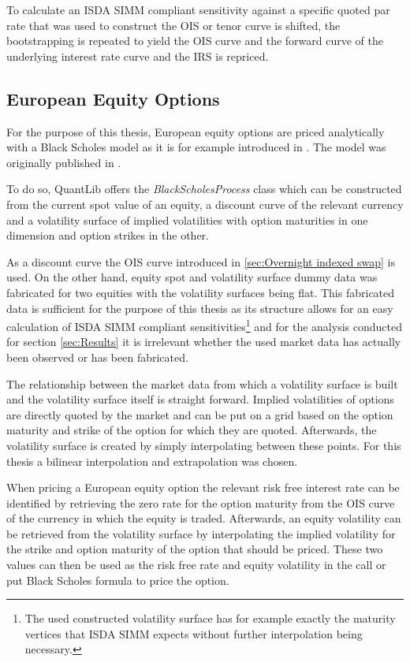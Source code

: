 \documentclass[../Thesis_AHoecherl.tex]{subfiles}
\begin{document}
    To calculate an ISDA SIMM compliant sensitivity against a specific quoted par rate that was used to construct the OIS or tenor curve is shifted, the bootstrapping is repeated to yield the OIS curve and the forward curve of the underlying interest rate curve and the IRS is repriced.    

    \subsection{European Equity Options}\label{sec:European Equity Options}

    For the purpose of this thesis, European equity options are priced analytically with a Black Scholes model as it is for example introduced in \cite[Chapter 14]{hull2009options}. The model was originally published in \cite{black1973pricing}.

    To do so, QuantLib offers the \emph{BlackScholesProcess} class which can be constructed from the current spot value of an equity, a discount curve of the relevant currency and a volatility surface of implied volatilities with option maturities in one dimension and option strikes in the other.

    As a discount curve the OIS curve introduced in \ref{sec:Overnight indexed swap} is used.
    On the other hand, equity spot and volatility surface dummy data was fabricated for two equities with the volatility surfaces being flat.
    This fabricated data is sufficient for the purpose of this thesis as its structure allows for an easy calculation of ISDA SIMM compliant sensitivities\footnote{The used constructed volatility surface has for example exactly the maturity vertices that ISDA SIMM expects without further interpolation being necessary.} and for the analysis conducted for section \ref{sec:Results} it is irrelevant whether the used market data has actually been observed or has been fabricated.

    The relationship between the market data from which a volatility surface is built and the volatility surface itself is straight forward.
    Implied volatilities of options are directly quoted by the market and can be put on a grid based on the option maturity and strike of the option for which they are quoted.
    Afterwards, the volatility surface is created by simply interpolating between these points. For this thesis a bilinear interpolation and extrapolation was chosen.

    When pricing a European equity option the relevant risk free interest rate can be identified by retrieving the zero rate for the option maturity from the OIS curve of the currency in which the equity is traded.
    Afterwards, an equity volatility can be retrieved from the volatility surface by interpolating the implied volatility for the strike and option maturity of the option that should be priced.
    These two values can then be used as the risk free rate and equity volatility in the call or put Black Scholes formula to price the option.
\end{document}

